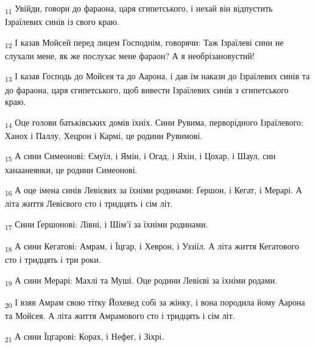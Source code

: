 \begin{tcolorbox}
\textsubscript{11} Увійди, говори до фараона, царя єгипетського, і нехай він відпустить Ізраїлевих синів із свого краю.
\end{tcolorbox}
\begin{tcolorbox}
\textsubscript{12} І казав Мойсей перед лицем Господнім, говорячи: Таж Ізраїлеві сини не слухали мене, як же послухає мене фараон? А я необрізановустий!
\end{tcolorbox}
\begin{tcolorbox}
\textsubscript{13} І казав Господь до Мойсея та до Аарона, і дав їм накази до Ізраїлевих синів та до фараона, царя єгипетського, щоб вивести Ізраїлевих синів з єгипетського краю.
\end{tcolorbox}
\begin{tcolorbox}
\textsubscript{14} Оце голови батьківських домів їхніх. Сини Рувима, перворідного Ізраїлевого: Ханох і Паллу, Хецрон і Кармі, це родини Рувимові.
\end{tcolorbox}
\begin{tcolorbox}
\textsubscript{15} А сини Симеонові: Ємуїл, і Ямін, і Огад, і Яхін, і Цохар, і Шаул, син ханаанеянки, це родини Симеонові.
\end{tcolorbox}
\begin{tcolorbox}
\textsubscript{16} А оце імена синів Левієвих за їхніми родинами: Ґершон, і Кегат, і Мерарі. А літа життя Левієвого сто і тридцять і сім літ.
\end{tcolorbox}
\begin{tcolorbox}
\textsubscript{17} Сини Ґершонові: Лівні, і Шім'ї за їхніми родинами.
\end{tcolorbox}
\begin{tcolorbox}
\textsubscript{18} А сини Кегатові: Амрам, і Їцгар, і Хеврон, і Уззіїл. А літа життя Кегатового сто і тридцять і три роки.
\end{tcolorbox}
\begin{tcolorbox}
\textsubscript{19} А сини Мерарі: Махлі та Муші. Оце родини Левієві за їхніми родами.
\end{tcolorbox}
\begin{tcolorbox}
\textsubscript{20} І взяв Амрам свою тітку Йохевед собі за жінку, і вона породила йому Аарона та Мойсея. А літа життя Амрамового сто і тридцять і сім літ.
\end{tcolorbox}
\begin{tcolorbox}
\textsubscript{21} А сини Їцгарові: Корах, і Нефеґ, і Зіхрі.
\end{tcolorbox}
